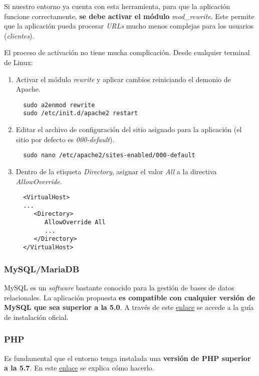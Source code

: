 Si nuestro entorno ya cuenta con esta herramienta, para que la
aplicación funcione correctamente, \textbf{se debe activar el módulo}
\emph{mod\_rewrite}. Este permite que la aplicación pueda procesar
\emph{URLs} mucho menos complejas para los usuarios (\emph{clientes}).

El proceso de activación no tiene mucha complicación. Desde cualquier
terminal de Linux:

\begin{enumerate}
\def\labelenumi{\arabic{enumi}.}
\tightlist
\item
  Activar el módulo \emph{rewrite} y aplicar cambios reiniciando el
  demonio de Apache.
  \begin{verbatim}
  sudo a2enmod rewrite
  sudo /etc/init.d/apache2 restart
  \end{verbatim}
\item
  Editar el archivo de configuración del sitio asignado para la
  aplicación (el sitio por defecto es \emph{000-default}).
  \begin{verbatim}
  sudo nano /etc/apache2/sites-enabled/000-default
  \end{verbatim}
\item
  Dentro de la etiqueta \emph{Directory}, asignar el valor \emph{All} a
  la directiva \emph{AllowOverride}.
  
  \begin{verbatim}
  <VirtualHost>
  ...
     <Directory>
        AllowOverride All
        ...
     </Directory>
  </VirtualHost>
  \end{verbatim}
\end{enumerate}



\subsubsection{MySQL/MariaDB}

MySQL es un \emph{software} bastante conocido para la gestión de bases
de datos relacionales. La aplicación propuesta \textbf{es compatible con
cualquier versión de MySQL que sea superior a la 5.0}. A través de este
\href{https://dev.mysql.com/doc/mysql-installation-excerpt/5.7/en/}{enlace}
se accede a la guía de instalación oficial.

\subsubsection{PHP}

Es fundamental que el entorno tenga instalada una \textbf{versión de PHP
superior a la 5.7}. En este
\href{https://www.php.net/manual/es/install.php}{enlace} se explica cómo
hacerlo.

